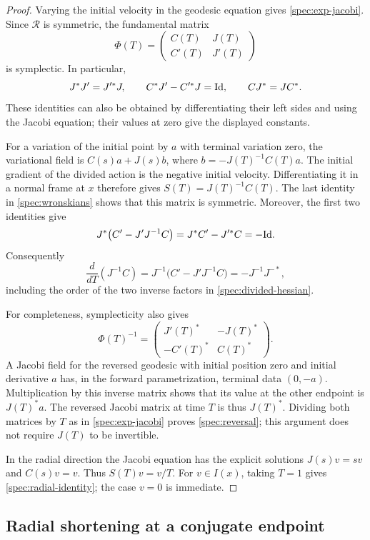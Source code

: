 \begin{proof}
Varying the initial velocity in the geodesic equation gives
\eqref{spec:exp-jacobi}.  Since $\mathcal R$ is symmetric, the fundamental
matrix
\[
  \Phi(T)=
  \begin{pmatrix}C(T)&J(T)\\ C'(T)&J'(T)\end{pmatrix}
\]
is symplectic.  In particular,
\begin{equation}\label{spec:wronskians}
  J^*J'=J'^*J,
  \qquad C^*J'-C'^*J=\mathrm{Id},
  \qquad CJ^*=JC^*.
\end{equation}
These identities can also be obtained by differentiating their left
sides and using the Jacobi equation; their values at zero give the
displayed constants.

For a variation of the initial point by $a$ with terminal variation zero,
the variational field is $C(s)a+J(s)b$, where
$b=-J(T)^{-1}C(T)a$.  The initial gradient of the divided action is the
negative initial velocity.  Differentiating it in a normal frame at $x$
therefore gives $S(T)=J(T)^{-1}C(T)$.  The last identity in
\eqref{spec:wronskians} shows that this matrix is symmetric.  Moreover,
the first two identities give
\[
  J^*\bigl(C'-J'J^{-1}C\bigr)
    =J^*C'-J'^*C=-\mathrm{Id}.
\]
Consequently
\[
  \frac{d}{dT}(J^{-1}C)
    =J^{-1}\bigl(C'-J'J^{-1}C\bigr)
    =-J^{-1}J^{-*},
\]
including the order of the two inverse factors in
\eqref{spec:divided-hessian}.

For completeness, symplecticity also gives
\[
  \Phi(T)^{-1}=
  \begin{pmatrix}J'(T)^*&-J(T)^*\\-C'(T)^*&C(T)^*\end{pmatrix}.
\]
A Jacobi field for the reversed geodesic with initial position zero and
initial derivative $a$ has, in the forward parametrization, terminal
data $(0,-a)$.  Multiplication by this inverse matrix shows that its
value at the other endpoint is $J(T)^*a$.  The reversed Jacobi matrix
at time $T$ is thus $J(T)^*$.  Dividing both matrices by $T$ as in
\eqref{spec:exp-jacobi} proves \eqref{spec:reversal}; this argument does
not require $J(T)$ to be invertible.

In the radial direction the Jacobi equation has the explicit solutions
$J(s)v=sv$ and $C(s)v=v$. Thus $S(T)v=v/T$. For $v\in I(x)$,
taking $T=1$ gives \eqref{spec:radial-identity}; the case $v=0$
is immediate.
\end{proof}

\subsection{Radial shortening at a conjugate endpoint}

